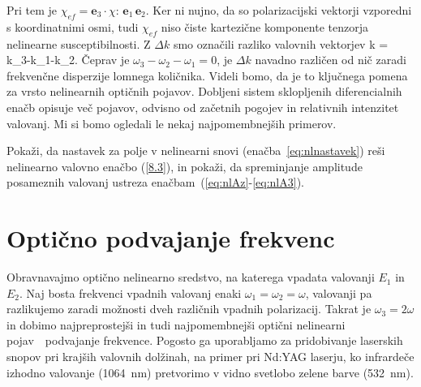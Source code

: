 Pri tem je $\chi_{ef}=\mathbf{e}_{3}\cdot\chi:\,\mathbf{e}_{1}\,\mathbf{e}_{2}$.
Ker ni nujno, da so polarizacijski vektorji vzporedni s koordinatnimi osmi, tudi $\chi_{ef}$ 
niso čiste kartezične komponente tenzorja nelinearne susceptibilnosti. 
Z $\Delta k$ smo označili razliko valovnih vektorjev
\beq
\Delta k = k_{3}-k_{1}-k_{2}.
\eeq
Čeprav je $\omega_{3}-\omega_{2}-\omega_{1}=0$, je $\Delta k$ navadno različen od nič zaradi 
frekvenčne disperzije lomnega količnika. Videli bomo, da je to ključnega pomena 
za vrsto nelinearnih optičnih pojavov. Dobljeni sistem sklopljenih diferencialnih enačb opisuje več pojavov, 
odvisno od začetnih pogojev in relativnih intenzitet valovanj. Mi si bomo ogledali le nekaj
najpomembnejših primerov.
\begin{definition}
Pokaži, da nastavek za polje v nelinearni snovi (enačba~\ref{eq:nlnastavek}) reši nelinearno
valovno enačbo (\ref{8.3}), in pokaži, da spreminjanje amplitude posameznih valovanj 
ustreza enačbam~(\ref{eq:nlAz}-\ref{eq:nlA3}).
\end{definition}

\section{Optično podvajanje frekvenc}

Obravnavajmo optično nelinearno sredstvo, na katerega vpadata valovanji $E_1$ in $E_2$.
Naj bosta frekvenci vpadnih valovanj enaki $\omega_{1}=\omega_{2}=\omega$, valovanji
pa razlikujemo zaradi možnosti dveh različnih vpadnih polarizacij. Takrat je $\omega_{3}=2\omega$
in dobimo najpreprostejši in tudi najpomembnejši optični nelinearni pojav~\textendash~podvajanje 
frekvence. 
Pogosto ga uporabljamo za pridobivanje laserskih snopov pri krajših valovnih dolžinah, na primer
pri Nd:YAG laserju, ko infrardeče izhodno valovanje (1064~nm) 
pretvorimo v vidno svetlobo zelene barve (532~nm). 


